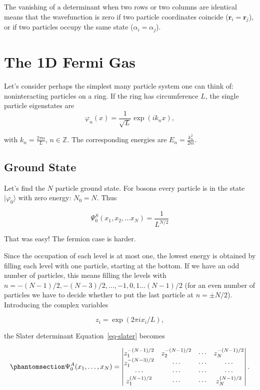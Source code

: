 \documentclass[
  letterpaper,
  DIV=11,
  numbers=noendperiod]{scrreprt}
\begin{document}
The vanishing of a determinant when two rows or two columns are
identical means that the wavefunction is zero if two particle
coordinates coincide (\(\mathbf{r}_{i}=\mathbf{r}_{j}\)), or if two
particles occupy the same state (\(\alpha_{i}=\alpha_{j}\)).

\chapter{The 1D Fermi Gas}\label{the-1d-fermi-gas}

Let's consider perhaps the simplest many particle system one can think
of: noninteracting particles on a ring. If the ring has circumference
\(L\), the single particle eigenstates are \[
    \label{quantum_statistics_spstates}
    \varphi_{n}(x)=\frac{1}{\sqrt{L}}\exp\left(ik_n x\right),
\]

with \(k_n=\frac{2\pi n}{L}\), \(n\in\mathbb{Z}\). The corresponding
energies are \(E_{n}=\frac{k_n^2}{2m}\).

\section{Ground State}\label{ground-state}

Let's find the \(N\) particle ground state. For bosons every particle is
in the state \(\lvert{\varphi_{0}}\rangle\) with zero energy:
\(N_{0}=N\). Thus

\[
    \Psi^{S}_0(x_{1},x_{2},\ldots x_{N})=\frac{1}{L^{N/2}}
\]

That was easy! The fermion case is harder.

Since the occupation of each level is at most one, the lowest energy is
obtained by filling each level with one particle, starting at the
bottom. If we have an odd number of particles, this means filling the
levels with \(n=-(N-1)/2, -(N-3)/2,\ldots, -1, 0, 1 \ldots (N-1)/2\)
(for an even number of particles we have to decide whether to put the
last particle at \(n=\pm N/2\)). Introducing the complex variables

\[
z_{i}=\exp(2 \pi i x_{i}/L),
\]

the Slater determinant Equation~\ref{eq-slater} becomes

\begin{equation}\phantomsection\label{eq-1d-det}{
    \Psi^A_0(x_1,\ldots, x_N)=\begin{vmatrix}
    z_{1}^{-(N-1)/2} &  z_{2}^{-(N-1)/2} & \cdots & z_{N}^{-(N-1)/2} \\
    z_{1}^{-(N-3)/2} &  \cdots & \cdots & \cdots  \\
    \cdots & \cdots & \cdots & \cdots  \\
    z_{1}^{(N-1)/2} &  \cdots & \cdots & z_{N}^{(N-1)/2}
\end{vmatrix}.
}\end{equation}
\end{document}
